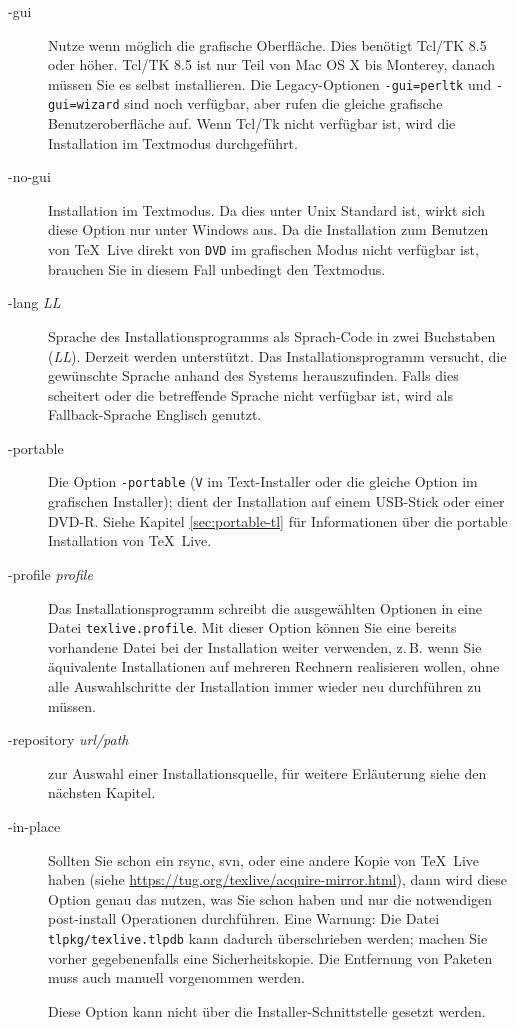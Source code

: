 \documentclass[12pt,ngerman,a4paper,fullparskip]{report}
\newcommand{\TL}{\TeX\ Live\xspace}
\newcommand{\acro}[1]{\texttt{#1}}
\newcommand{\code}[1]{\texttt{#1}}
\newcommand{\filename}[1]{\texttt{#1}}
\providecommand*{\DVD}{\acro{DVD}\xspace}
\begin{document}
\begin{description}
\item[-gui] Nutze wenn möglich die grafische Oberfläche. Dies benötigt Tcl/TK 8.5  oder höher. Tcl/TK 8.5 ist nur Teil von Mac OS X bis Monterey, danach müssen Sie es selbst installieren. Die Legacy-Optionen \texttt{-gui=perltk} und \texttt{-gui=wizard} sind noch verfügbar, aber rufen die gleiche grafische Benutzeroberfläche auf.  Wenn Tcl/Tk nicht verfügbar ist, wird die Installation im Textmodus durchgeführt.

\item[-no-gui] Installation im Textmodus. Da dies unter Unix Standard ist, wirkt sich diese Option nur
  unter Windows aus. Da die Installation zum Benutzen von \TL direkt von \DVD im grafischen Modus nicht
  verfügbar ist, brauchen Sie in diesem Fall unbedingt den Textmodus.

\item[-lang {\textsl{LL}}] Sprache des Installationsprogramms als Sprach-Code in zwei Buchstaben (\textsl{LL}).
  Derzeit werden unterstützt. Das Installationsprogramm versucht, die gewünschte Sprache anhand des
  Systems herauszufinden. Falls dies scheitert oder die betreffende Sprache nicht verfügbar ist, wird als
  Fallback-Sprache Englisch genutzt.

\item[-portable] Die Option \code{-portable} (\code{V} im Text-Installer oder die gleiche Option im grafischen Installer);  dient der Installation auf einem USB-Stick oder einer DVD-R. Siehe Kapitel \ref{sec:portable-tl} für Informationen über die portable Installation von \TL.

\item[-profile {\textsl{profile}}] Das Installationsprogramm schreibt die ausgewählten Optionen in eine Datei
  \filename{texlive.profile}. Mit dieser Option können
  Sie eine bereits vorhandene Datei bei der Installation weiter verwenden, z.\,B. wenn Sie äquivalente
  Installationen auf mehreren Rechnern realisieren wollen, ohne alle Auswahlschritte der Installation immer
  wieder neu durchführen zu müssen.

\item [-repository {\textsl{url/path}}] zur Auswahl einer Installationsquelle,
  für weitere Erläuterung siehe den nächsten Kapitel.


\item[-in-place] Sollten Sie schon ein rsync, svn, oder eine andere Kopie von 
  \TL{} haben (siehe \url{https://tug.org/texlive/acquire-mirror.html}), dann wird diese Option genau das nutzen, was Sie schon haben und nur die notwendigen post-install Operationen durchführen. Eine Warnung: Die Datei \newline \filename{tlpkg/texlive.tlpdb} kann dadurch überschrieben werden; machen Sie vorher gegebenenfalls eine Sicherheitskopie. Die Entfernung von Paketen muss auch manuell vorgenommen werden. 
	
Diese Option kann nicht über die Installer-Schnittstelle gesetzt werden.
\end{description}
\end{document}

